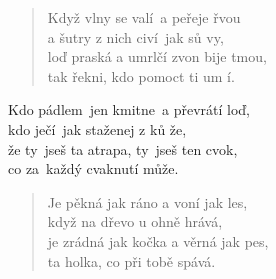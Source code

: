 \begin{song}{}
\begin{verse}
   Když vlny se valí~a peřeje řvou  \\
   a šutry z nich civí~jak sů vy,  \\
   loď praská a umrlčí zvon bije tmou,  \\
   tak řekni, kdo pomoct ti um í. 
\end{verse}
\begin{deco}
   Kdo pádlem~jen kmitne~a převrátí loď,  \\
   kdo ječí~jak staženej z ků že,  \\
   že ty~jseš ta atrapa, ty~jseš ten cvok,  \\
   co za~každý cvaknutí může. 
\end{deco}
\begin{verse}
   Je pěkná jak ráno a voní jak les, \\
   když na dřevo u ohně hrává, \\
   je zrádná jak kočka a věrná jak pes, \\
   ta holka, co při tobě spává. 
\end{verse}

\pagebreak


\end{song}
